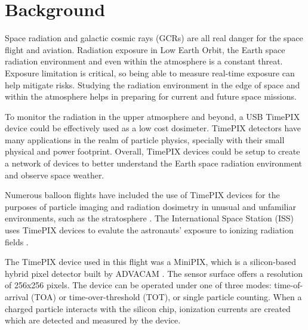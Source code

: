 %
%

\section{Background}
\label{Background}
Space radiation and galactic cosmic rays (GCRs) are all real danger for the space flight and aviation.  Radiation exposure in Low Earth Orbit, the Earth space radiation environment and even within the atmosphere is a constant threat. Exposure limitation is critical, so being able to measure real-time exposure can help mitigate risks.  Studying the radiation environment in the edge of space and within the atmosphere helps in preparing for current and future space missions.  

To monitor the radiation in the upper atmosphere and beyond, a USB TimePIX device could be effectively used as a low cost dosimeter.  TimePIX detectors have many applications in the realm of particle physics, specially with their small physical and power footprint. Overall, TimePIX devices could be setup to create a network of devices to better understand the Earth space radiation environment and observe space weather.

%
Numerous balloon flights have included the use of TimePIX devices for the purposes of particle imaging and radiation dosimetry in unusual and unfamiliar environments, such as the stratosphere \cite{bexus}. 
%
The International Space Station (ISS) uses TimePIX devices to evalute the astronauts' exposure to ionizing radiation fields \cite{timepix}.

The TimePIX device used in this flight was a MiniPIX, which is a silicon-based hybrid pixel detector built by ADVACAM \cite{advacam}. 
%
The sensor surface offers a resolution of 256x256 pixels.
%
The device can be operated under one of three modes: time-of-arrival (TOA) or time-over-threshold (TOT), or single particle counting. 
%
When a charged particle interacts with the silicon chip, ionization currents are created which are detected and measured by the device.


